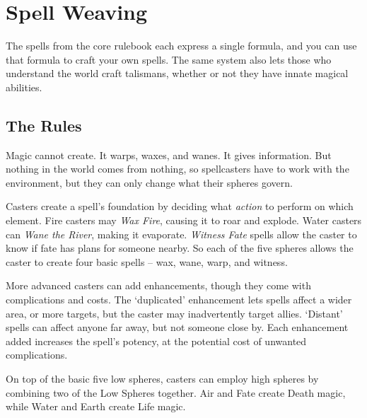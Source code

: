 \chapter{Spell Weaving}

The spells from the core rulebook each express a single formula, and you can use that formula to craft your own spells.
The same system also lets those who understand the world craft \glspl{talisman}, whether or not they have innate magical abilities.

\section{The Rules}

\begin{multicols}{2}

\noindent
Magic cannot create.
It warps, waxes, and wanes.
It gives information.
But nothing in the world comes from nothing, so spellcasters have to work with the environment, but they can only change what their spheres govern.

Casters create a spell's foundation by deciding what \emph{action} to perform on which element.
Fire casters may \textit{Wax Fire}, causing it to roar and explode.
Water casters can \textit{Wane the River}, making it evaporate.
\textit{Witness Fate} spells allow the caster to know if fate has plans for someone nearby.
So each of the five spheres allows the caster to create four basic spells -- wax, wane, warp, and witness.

More advanced casters can add enhancements, though they come with complications and costs.
The `duplicated' enhancement lets spells affect a wider area, or more targets, but the caster may inadvertently target allies.
`Distant' spells can affect anyone far away, but not someone close by.
Each enhancement added increases the spell's potency, at the potential cost of unwanted complications.

On top of the basic five low spheres, casters can employ high spheres by combining two of the Low Spheres together.
Air and Fate create Death magic, while Water and Earth create Life magic.


\end{multicols}
